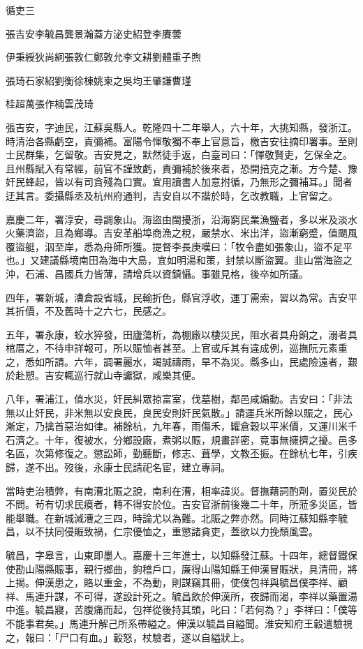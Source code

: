 
\begin{pinyinscope}
循吏三

張吉安李毓昌龔景瀚蓋方泌史紹登李賡蕓

伊秉綬狄尚絅張敦仁鄭敦允李文耕劉體重子煦

張琦石家紹劉衡徐棟姚柬之吳均王肇謙曹瑾

桂超萬張作楠雲茂琦

張吉安，字迪民，江蘇吳縣人。乾隆四十二年舉人，六十年，大挑知縣，發浙江。時清治各縣虧空，責彌補。富陽令惲敬獨不奉上官意旨，檄吉安往摘印署事。至則士民群集，乞留敬。吉安見之，默然徒手返，白臺司曰：「惲敬賢吏，乞保全之。且州縣賦入有常經，前官不謹致虧，責彌補於後來者，恐開掊克之漸。方今楚、豫奸民蜂起，皆以有司貪殘為口實。宜用讀書人加意拊循，乃無形之彌補耳。」聞者迂其言。委攝縣丞及杭州府通判，吉安自以不諧於時，乞改教職，上官留之。

嘉慶二年，署淳安，尋調象山。海盜由閩擾浙，沿海窮民業漁鹽者，多以米及淡水火藥濟盜，且為鄉導。吉安革船埠商漁之稅，嚴禁水、米出洋，盜漸窮蹙，值颶風覆盜艇，泅至岸，悉為舟師所獲。提督李長庚嘆曰：「牧令盡如張象山，盜不足平也。」又建議縣境南田為海中大島，宜如明湯和策，封禁以斷盜翼。韭山當海盜之沖，石浦、昌國兵力皆薄，請增兵以資鎮懾。事雖見格，後卒如所議。

四年，署新城，漕倉設省城，民輸折色，縣官浮收，運丁需索，習以為常。吉安平其折價，不及舊時十之六七，民感之。

五年，署永康，蛟水猝發，田廬蕩析，為棚廠以棲災民，阻水者具舟餉之，溺者具棺厝之，不待申詳報可，所以賑恤者甚至。上官或斥其有違成例，巡撫阮元素重之，悉如所請。六年，調署麗水，竭誠禱雨，旱不為災。縣多山，民處險遠者，艱於赴愬。吉安輒巡行就山寺讞獄，咸樂其便。

八年，署浦江，值水災，奸民糾眾掠富室，伐墓樹，鄰邑咸煽動。吉安曰：「非法無以止奸民，非米無以安良民，良民安則奸民氣散。」請運兵米所餘以賑之，民心漸定，乃擒首惡治如律。補餘杭，九年春，雨傷禾，糶倉穀以平米價，又運川米千石濟之。十年，復被水，分鄉設廠，煮粥以賑，規畫詳密，竟事無擁擠之擾。邑多名區，次第修復之。懲訟師，勤聽斷，修志、葺學，文教丕振。在餘杭七年，引疾歸，遂不出。歿後，永康士民請祀名宦，建立專祠。

當時吏治積弊，有南漕北賑之說，南利在漕，相率諱災。督撫藉詞酌劑，置災民於不問。茍有切求民瘼者，轉不得安於位。吉安官浙前後幾二十年，所蒞多災區，皆能舉職。在新城減漕之三四，時論尤以為難。北賑之弊亦然。同時江蘇知縣李毓昌，以不扶同侵賑致禍，仁宗優恤之，重懲諸貪吏，蓋欲以力挽頹風雲。

毓昌，字皋言，山東即墨人。嘉慶十三年進士，以知縣發江蘇。十四年，總督鐵保使勘山陽縣賑事，親行鄉曲，鉤稽戶口，廉得山陽知縣王伸漢冒賑狀，具清冊，將上揭。伸漢患之，賂以重金，不為動，則謀竊其冊，使僕包祥與毓昌僕李祥、顧祥、馬連升謀，不可得，遂設計死之。毓昌飲於伸漢所，夜歸而渴，李祥以藥置湯中進。毓昌寢，苦腹痛而起，包祥從後持其頭，叱曰：「若何為？」李祥曰：「僕等不能事君矣。」馬連升解己所系帶縊之。伸漢以毓昌自縊聞。淮安知府王轂遣驗視之，報曰：「尸口有血。」轂怒，杖驗者，遂以自縊狀上。


\end{pinyinscope}
